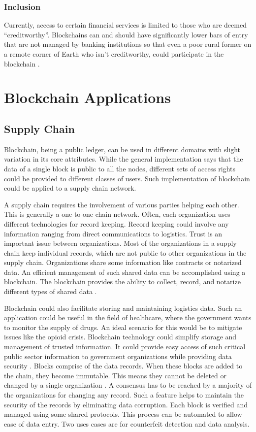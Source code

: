 \documentclass[sigconf]{acmart}
\begin{document}
\subsubsection{Inclusion} Currently, access to certain financial services is limited to those who are deemed ``creditworthy''. Blockchains can and should have significantly lower bars of entry that are not managed by banking institutions so that even a poor rural former on a remote corner of Earth who isn't creditworthy, could participate in the blockchain \cite{tapscott}.

\section{Blockchain Applications}
\subsection{Supply Chain}
Blockchain, being a public ledger, can be used in different domains with slight variation in its core attributes. While the general implementation says that the data of a single block is public to all the nodes, different sets of access rights could be provided to different classes of users.  Such implementation of blockchain could be applied to a supply chain network. 

A supply chain requires the involvement of various parties helping each other. This is generally a one-to-one chain network. Often, each organization uses different technologies for record keeping. Record keeping could involve any information ranging from direct communications to logistics. Trust is an important issue between organizations. Most of the organizations in a supply chain keep individual records, which are not public to other organizations in the supply chain. Organizations share some information like contracts or notarized data. An efficient management of such shared data can be accomplished using a blockchain. The blockchain provides the ability to collect, record, and notarize different types of shared data \cite{arbc1}. 

Blockchain could also facilitate storing and maintaining logistics data. Such an application could be useful in the field of healthcare, where the government wants to monitor the supply of drugs. An ideal scenario for this would be to mitigate issues like the opioid crisis. Blockchain technology could simplify storage and management of trusted information. It could provide easy access of such critical public sector information to government organizations while providing data security \cite{arbc2}. Blocks comprise of the data records. When these blocks are added to the chain, they become immutable. This means they cannot be deleted or changed by a single organization \cite{arbc2}. A consensus has to be reached by a majority of the organizations for changing any record. Such a feature helps to maintain the security of the records by eliminating data corruption. Each block is verified and managed using some shared protocols. This process can be automated to allow ease of data entry. Two uses cases are for counterfeit detection and data analysis.
\end{document}
